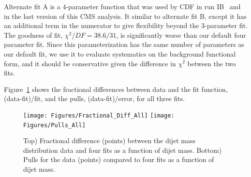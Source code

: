 Alternate fit A is a 4-parameter function that was used by CDF 
in run IB~\cite{Abe:1997hm} and in the last version of this CMS analysis.
It similar to alternate fit B, except it has an additional term in the numerator to give flexibility beyond the
3-parameter fit. The goodness of fit, $\chi^2/DF=38.6/31$, is significantly worse than 
our default four parameter fit. Since this parameterization has the same number of 
parameters as our default fit, we use it to evaluate systematics on the background
functional form, and it should be conservative given the difference in $\chi^2$ between the
two fits.

Figure~\ref{dijetmassFits} shows the fractional 
differences between data and the fit function, (data-fit)/fit, 
and the pulls, (data-fit)/error, for all three fits.

\begin{figure}[!ht]
  \begin{center}
        \texttt{[image: Figures/Fractional\_Diff\_All]}
        \texttt{[image: Figures/Pulls\_All]}
    \caption{ Top) Fractional difference (points) between the dijet mass distribution 
data and four fits as a function of dijet mass.
Bottom) Pulls for the data (points) compared to four fits as a function of dijet mass.}
    \label{dijetmassFits}
  \end{center}
\end{figure}


\clearpage
